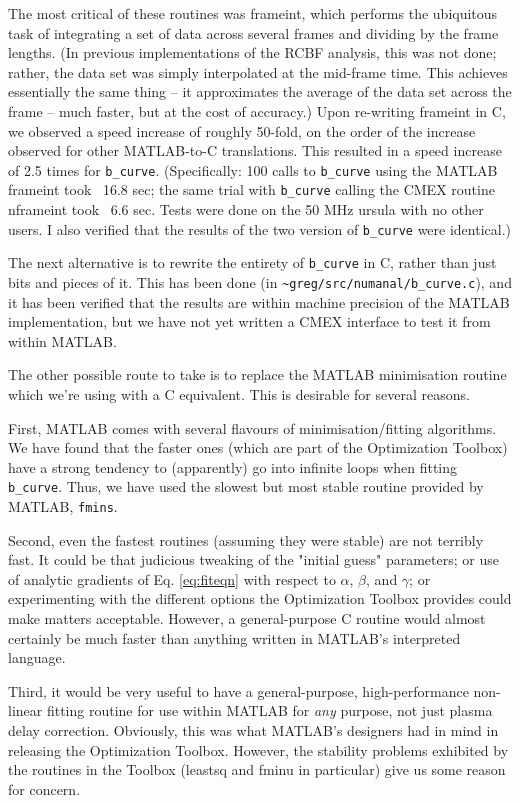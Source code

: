 The most critical of these routines was frameint, which performs the
ubiquitous task of integrating a set of data across several frames and
dividing by the frame lengths.  (In previous implementations of the
RCBF analysis, this was not done; rather, the data set was simply
interpolated at the mid-frame time.  This achieves essentially the
same thing -- it approximates the average of the data set across the
frame -- much faster, but at the cost of accuracy.)  Upon re-writing
frameint in C, we observed a speed increase of roughly 50-fold, on the
order of the increase observed for other MATLAB-to-C translations.
This resulted in a speed increase of 2.5 times for \verb|b_curve|.
(Specifically: 100 calls to \verb|b_curve| using the MATLAB frameint
took ~16.8 sec; the same trial with \verb|b_curve| calling the CMEX
routine nframeint took ~6.6 sec.  Tests were done on the 50 MHz ursula
with no other users.  I also verified that the results of the two
version of \verb|b_curve| were identical.)

The next alternative is to rewrite the entirety of \verb|b_curve| in
C, rather than just bits and pieces of it.  This has been done (in
\verb|~greg/src/numanal/b_curve.c|), and it has been verified that the
results are within machine precision of the MATLAB implementation, but
we have not yet written a CMEX interface to test it from within MATLAB.

The other possible route to take is to replace the MATLAB minimisation
routine which we're using with a C equivalent.  This is desirable for
several reasons.

First, MATLAB comes with several flavours of minimisation/fitting
algorithms.  We have found that the faster ones (which are part of the
Optimization Toolbox) have a strong tendency to (apparently) go into
infinite loops when fitting \verb|b_curve|.  Thus, we have used the
slowest but most stable routine provided by MATLAB, \verb|fmins|.

Second, even the fastest routines (assuming they were stable) are not
terribly fast.  It could be that judicious tweaking of the "initial
guess" parameters; or use of analytic gradients of Eq. \ref{eq:fiteqn}
with respect to $\alpha$, $\beta$, and $\gamma$; or experimenting with
the different options the Optimization Toolbox provides could make
matters acceptable.  However, a general-purpose C routine would almost
certainly be much faster than anything written in MATLAB's interpreted
language.

Third, it would be very useful to have a general-purpose,
high-performance non-linear fitting routine for use within MATLAB for
{\em any} purpose, not just plasma delay correction.  Obviously, this
was what MATLAB's designers had in mind in releasing the Optimization
Toolbox.  However, the stability problems exhibited by the routines in
the Toolbox (leastsq and fminu in particular) give us some reason for
concern.

